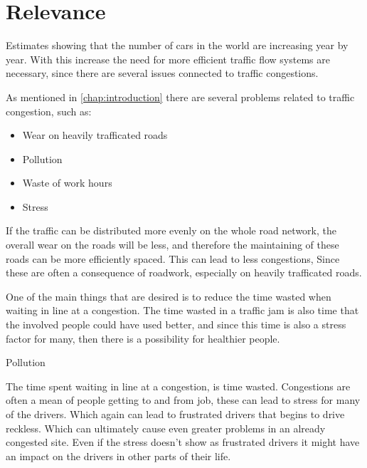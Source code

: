 \section{Relevance}
Estimates showing that the number of cars in the world are increasing year by year. With this increase the need for more efficient traffic flow systems are necessary, since there are several issues connected to traffic congestions.

As mentioned in \ref{chap:introduction} there are several problems related to traffic congestion, such as:
\begin{itemize}
	\item Wear on heavily trafficated roads
	\item Pollution
	\item Waste of work hours
	\item Stress
\end{itemize}

If the traffic can be distributed more evenly on the whole road network, the overall wear on the roads will be less, and therefore the maintaining of these roads can be more efficiently spaced. This can lead to less congestions, Since these are often a consequence of roadwork, especially on heavily trafficated roads.

One of the main things that are desired is to reduce the time wasted when waiting in line at a congestion.
The time wasted in a traffic jam is also time that the involved people could have used better, and since this time is also a stress factor for many, then there is a possibility for healthier people. 

Pollution

The time spent waiting in line at a congestion, is time wasted. Congestions are often a mean of people getting to and from job, these can lead to stress for many of the drivers. Which again can lead to frustrated drivers that begins to drive reckless. Which can ultimately cause even greater problems in an already congested site. Even if the stress doesn't show as frustrated drivers it might have an impact on the drivers in other parts of their life.